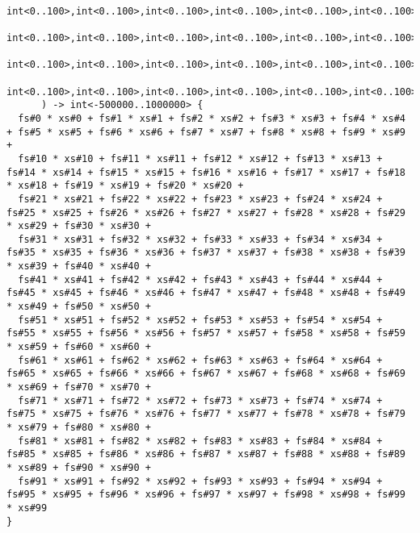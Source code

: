 \documentclass[msc,lith,english]{liuthesis}
\begin{document}
\begin{verbatim}
            int<0..100>,int<0..100>,int<0..100>,int<0..100>,int<0..100>,int<0..100>,int<0..100>,int<0..100>,int<0..100>,int<0..100>,
            int<0..100>,int<0..100>,int<0..100>,int<0..100>,int<0..100>,int<0..100>,int<0..100>,int<0..100>,int<0..100>,int<0..100>,
            int<0..100>,int<0..100>,int<0..100>,int<0..100>,int<0..100>,int<0..100>,int<0..100>,int<0..100>,int<0..100>,int<0..100>,
            int<0..100>,int<0..100>,int<0..100>,int<0..100>,int<0..100>,int<0..100>,int<0..100>,int<0..100>,int<0..100>,int<0..100>)
      ) -> int<-500000..1000000> {
  fs#0 * xs#0 + fs#1 * xs#1 + fs#2 * xs#2 + fs#3 * xs#3 + fs#4 * xs#4 + fs#5 * xs#5 + fs#6 * xs#6 + fs#7 * xs#7 + fs#8 * xs#8 + fs#9 * xs#9 + 
  fs#10 * xs#10 + fs#11 * xs#11 + fs#12 * xs#12 + fs#13 * xs#13 + fs#14 * xs#14 + fs#15 * xs#15 + fs#16 * xs#16 + fs#17 * xs#17 + fs#18 * xs#18 + fs#19 * xs#19 + fs#20 * xs#20 + 
  fs#21 * xs#21 + fs#22 * xs#22 + fs#23 * xs#23 + fs#24 * xs#24 + fs#25 * xs#25 + fs#26 * xs#26 + fs#27 * xs#27 + fs#28 * xs#28 + fs#29 * xs#29 + fs#30 * xs#30 +
  fs#31 * xs#31 + fs#32 * xs#32 + fs#33 * xs#33 + fs#34 * xs#34 + fs#35 * xs#35 + fs#36 * xs#36 + fs#37 * xs#37 + fs#38 * xs#38 + fs#39 * xs#39 + fs#40 * xs#40 +
  fs#41 * xs#41 + fs#42 * xs#42 + fs#43 * xs#43 + fs#44 * xs#44 + fs#45 * xs#45 + fs#46 * xs#46 + fs#47 * xs#47 + fs#48 * xs#48 + fs#49 * xs#49 + fs#50 * xs#50 +
  fs#51 * xs#51 + fs#52 * xs#52 + fs#53 * xs#53 + fs#54 * xs#54 + fs#55 * xs#55 + fs#56 * xs#56 + fs#57 * xs#57 + fs#58 * xs#58 + fs#59 * xs#59 + fs#60 * xs#60 +
  fs#61 * xs#61 + fs#62 * xs#62 + fs#63 * xs#63 + fs#64 * xs#64 + fs#65 * xs#65 + fs#66 * xs#66 + fs#67 * xs#67 + fs#68 * xs#68 + fs#69 * xs#69 + fs#70 * xs#70 +
  fs#71 * xs#71 + fs#72 * xs#72 + fs#73 * xs#73 + fs#74 * xs#74 + fs#75 * xs#75 + fs#76 * xs#76 + fs#77 * xs#77 + fs#78 * xs#78 + fs#79 * xs#79 + fs#80 * xs#80 +
  fs#81 * xs#81 + fs#82 * xs#82 + fs#83 * xs#83 + fs#84 * xs#84 + fs#85 * xs#85 + fs#86 * xs#86 + fs#87 * xs#87 + fs#88 * xs#88 + fs#89 * xs#89 + fs#90 * xs#90 +
  fs#91 * xs#91 + fs#92 * xs#92 + fs#93 * xs#93 + fs#94 * xs#94 + fs#95 * xs#95 + fs#96 * xs#96 + fs#97 * xs#97 + fs#98 * xs#98 + fs#99 * xs#99
}


\end{verbatim}
\end{document}
